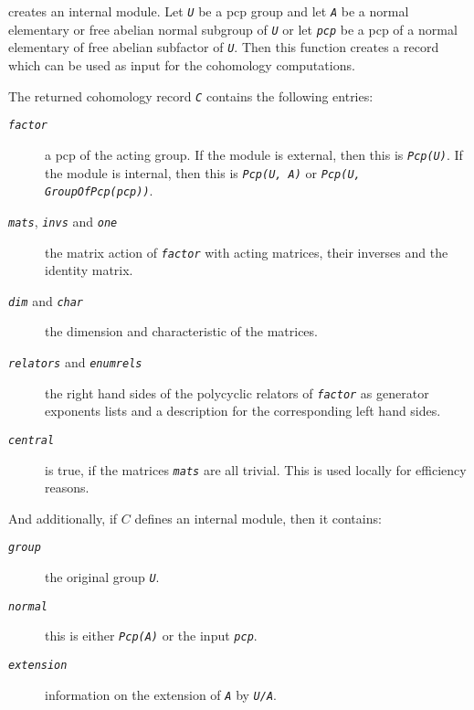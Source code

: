 \documentclass[a4paper,11pt]{report}
\begin{document}
{{{ creates an internal module. Let \mbox{\texttt{\mdseries\slshape U}} be a pcp group and let \mbox{\texttt{\mdseries\slshape A}} be a normal elementary or free abelian normal subgroup of \mbox{\texttt{\mdseries\slshape U}} or let \mbox{\texttt{\mdseries\slshape pcp}} be a pcp of a normal elementary of free abelian subfactor of \mbox{\texttt{\mdseries\slshape U}}. Then this function creates a record which can be used as input for the
cohomology computations. 

 The returned cohomology record \mbox{\texttt{\mdseries\slshape C}} contains the following entries: 
\begin{description}
\item[{\mbox{\texttt{\mdseries\slshape factor}}}]  a pcp of the acting group. If the module is external, then this is \mbox{\texttt{\mdseries\slshape Pcp(U)}}. If the module is internal, then this is \mbox{\texttt{\mdseries\slshape Pcp(U, A)}} or \mbox{\texttt{\mdseries\slshape Pcp(U, GroupOfPcp(pcp))}}. 
\item[{\mbox{\texttt{\mdseries\slshape mats}}, \mbox{\texttt{\mdseries\slshape invs}} and \mbox{\texttt{\mdseries\slshape one}}}]  the matrix action of \mbox{\texttt{\mdseries\slshape factor}} with acting matrices, their inverses and the identity matrix. 
\item[{\mbox{\texttt{\mdseries\slshape dim}} and \mbox{\texttt{\mdseries\slshape char}}}]  the dimension and characteristic of the matrices. 
\item[{\mbox{\texttt{\mdseries\slshape relators}} and \mbox{\texttt{\mdseries\slshape enumrels}}}]  the right hand sides of the polycyclic relators of \mbox{\texttt{\mdseries\slshape factor}} as generator exponents lists and a description for the corresponding left hand
sides. 
\item[{\mbox{\texttt{\mdseries\slshape central}}}]  is true, if the matrices \mbox{\texttt{\mdseries\slshape mats}} are all trivial. This is used locally for efficiency reasons. 
\end{description}
 And additionally, if $C$ defines an internal module, then it contains: 
\begin{description}
\item[{\mbox{\texttt{\mdseries\slshape group}}}]  the original group \mbox{\texttt{\mdseries\slshape U}}. 
\item[{\mbox{\texttt{\mdseries\slshape normal}}}]  this is either \mbox{\texttt{\mdseries\slshape Pcp(A)}} or the input \mbox{\texttt{\mdseries\slshape pcp}}. 
\item[{\mbox{\texttt{\mdseries\slshape extension}}}]  information on the extension of \mbox{\texttt{\mdseries\slshape A}} by \mbox{\texttt{\mdseries\slshape U/A}}. 
\end{description}
 }

}}
\end{document}
